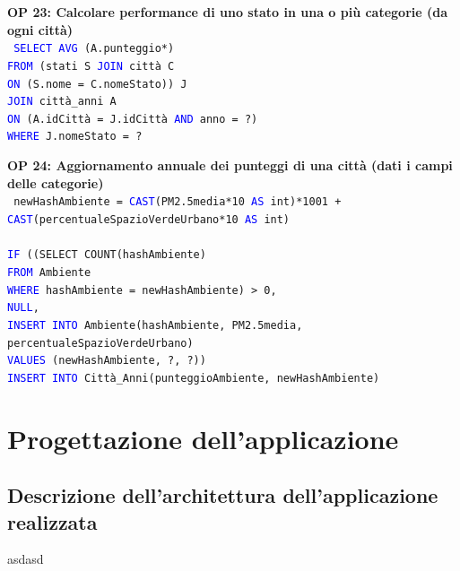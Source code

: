\documentclass[a4paper,12pt]{report}
\begin{document}
            \noindent
            \textbf{OP 23: Calcolare performance di uno stato in una o più categorie (da ogni città)} \\
            \texttt{
                \textcolor{blue}{SELECT AVG} (A.punteggio*) \\
                \textcolor{blue}{FROM} (stati S \textcolor{blue}{JOIN} città C \\
                \textcolor{blue}{ON} (S.nome = C.nomeStato)) J \\
                \textcolor{blue}{JOIN} città\_anni A \\
                \textcolor{blue}{ON} (A.idCittà = J.idCittà \textcolor{blue}{AND} anno = ?) \\
                \textcolor{blue}{WHERE} J.nomeStato = ? \\
            }

            \noindent
            \textbf{OP 24: Aggiornamento annuale dei punteggi di una città (dati i campi delle categorie)} \\
            \texttt{
                newHashAmbiente = \textcolor{blue}{CAST}(PM2.5media*10 \textcolor{blue}{AS} int)*1001 + \textcolor{blue}{CAST}(percentualeSpazioVerdeUrbano*10 \textcolor{blue}{AS} int) \\ \\
                \textcolor{blue}{IF} ((SELECT COUNT(hashAmbiente) \\
                \textcolor{blue}{FROM} Ambiente \\
                \textcolor{blue}{WHERE} hashAmbiente = newHashAmbiente) > 0,  \\
                \textcolor{blue}{NULL},  \\
                \textcolor{blue}{INSERT INTO} Ambiente(hashAmbiente, PM2.5media, percentualeSpazioVerdeUrbano) \\
                \textcolor{blue}{VALUES} (newHashAmbiente, ?, ?)) \\
                \textcolor{blue}{INSERT INTO} Città\_Anni(punteggioAmbiente, newHashAmbiente) \\
            }

        \chapter{Progettazione dell'applicazione}
            
    	\section{Descrizione dell'architettura dell'applicazione realizzata}
        	asdasd
 
\end{document}
